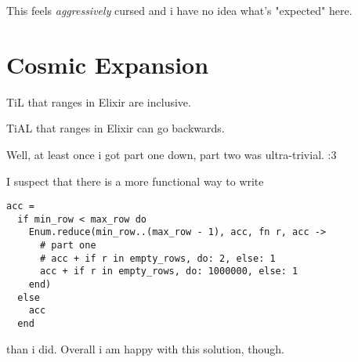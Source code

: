 \documentclass{article}
\begin{document}
This feels \textit{aggressively} cursed and i have no idea what's "expected" here.

\section{Cosmic Expansion}
TiL that ranges in Elixir are inclusive.

TiAL that ranges in Elixir can go backwards.

Well, at least once i got part one down, part two was ultra-trivial. :3

I suspect that there is a more functional way to write
\begin{verbatim}
acc =
  if min_row < max_row do
    Enum.reduce(min_row..(max_row - 1), acc, fn r, acc ->
      # part one
      # acc + if r in empty_rows, do: 2, else: 1
      acc + if r in empty_rows, do: 1000000, else: 1
    end)
  else
    acc
  end
\end{verbatim}
than i did. Overall i am happy with this solution, though.
\end{document}
